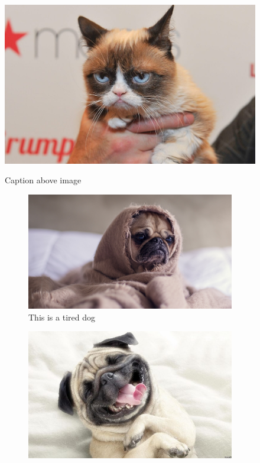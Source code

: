 \documentclass{article}
\begin{document}
                \begin{figure}[h]
                    \caption{Caption above image}
                    \includegraphics[width=0.5\linewidth]{Images/cat.jpg}
                    \centering
                    \label{fig:cat1}
                \end{figure}
                \FloatBarrier

                \begin{figure}[h]
                    \begin{subfigure}{0.45\linewidth}
                        \centering
                        \includegraphics[width=\textwidth]{Images/tireddog.jpg}
                        \caption{This is a tired dog}
                        \label{fig:figure1}
                    \end{subfigure}
                \hspace{0.5cm}
                    \begin{subfigure}{0.45\linewidth}
                        \centering
                        \includegraphics[width=\textwidth]{Images/happydog.jpg}

\end{subfigure}
\end{figure}
\end{document}
